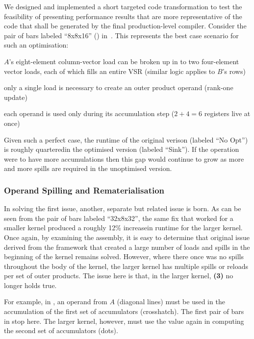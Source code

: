 \documentclass[\main/thesis.tex]{subfiles}
\begin{document}
 We designed and  implemented a short targeted code transformation to test the feasibility of presenting performance results that are more representative of the  code that shall be generated by the final production-level compiler.
Consider the pair of bars labeled ``8x8x16'' () in~.
This represents the best case scenario for such an optimisation:
\begin{enumerate*}[itemjoin={{; }}, itemjoin*={{; and }}, label=\textbf{(\arabic*)}, after={.}]
  \item $A$'s eight-element column-vector load can be broken up in to two four-element vector loads, each of which fills an entire VSR (similar logic applies to $B$'s rows)
  \item only a single load is necessary to create an outer product operand (rank-one update)
  \item each operand is used only during its accumulation step ($2+4=6$ registers \gls{live} at once)
\end{enumerate*}
Given such a perfect case, the runtime of the original verison (labeled ``No Opt'') is roughly quartered\footnotemark in the optimised version (labeled ``Sink'').
If the operation were to have more accumulations then this gap would continue to grow as more and more spills are required in the unoptimised version.

\subsubsection{Operand Spilling and Rematerialisation}
In solving the first issue, another, separate but related issue is born.
As can be seen from the pair of bars labeled ``32x8x32'', the same fix that worked for a smaller kernel produced a roughly 12\% increase\footnotemark in runtime for the larger kernel.
Once again, by examining the assembly, it is easy to determine that original issue derived from the framework that created a large number of loads and spills in the beginning of the kernel remains solved.
However, where there once was no spills throughout the body of the kernel, the larger kernel has multiple spills or reloads per set of outer products.
The issue here is that, in the larger kernel, \textbf{(3)} no longer holds true.

For example, in , an operand from $A$ (diagonal lines) must be used in the accumulation of the first set of accumulators (crosshatch).
The first pair of bars in  stop here.
The larger kernel, however, must use the value again in computing the second set of accumulators (dots).
\end{document}
